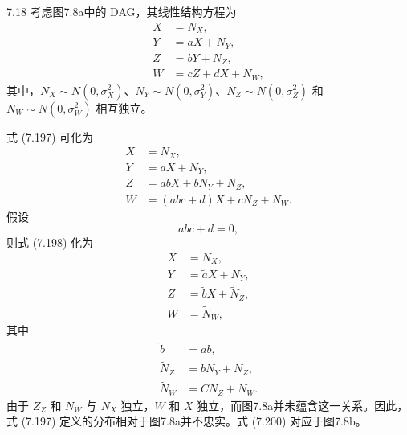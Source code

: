 \begin{bookexample}{7.18}
考虑图7.8a中的 DAG，其线性结构方程为
\begin{equation}
\begin{aligned}
X&=N_X,\\
Y&=aX+N_Y,\\
Z&=bY+N_Z,\\
W&=cZ+dX+N_W,
\end{aligned}
\tag{7.197}
\end{equation}
其中，$N_X\sim N(0,\sigma_X^2)$、$N_Y\sim N(0,\sigma_Y^2)$、$N_Z\sim N(0,\sigma_Z^2)$ 和 $N_W\sim N(0,\sigma_W^2)$ 相互独立。

式 (7.197) 可化为
\begin{equation}
\begin{aligned}
X&=N_X,\\
Y&=aX+N_Y,\\
Z&=abX+bN_Y+N_Z,\\
W&=(abc+d)X+cN_Z+N_W.
\end{aligned}
\tag{7.198}
\end{equation}
假设
\begin{equation}
abc+d=0,
\tag{7.199}
\end{equation}
则式 (7.198) 化为
\begin{equation}
\begin{aligned}
X&=N_X,\\
Y&=\widetilde aX+N_Y,\\
Z&=\widetilde bX+\widetilde N_Z,\\
W&=\widetilde N_W,
\end{aligned}
\tag{7.200}
\end{equation}
其中
\[
\begin{aligned}
\widetilde b&=ab,\\
\widetilde N_Z&=bN_Y+N_Z,\\
\widetilde N_W&=CN_Z+N_W.
\end{aligned}
\]
由于 $Z_Z$ 和 $N_W$ 与 $N_X$ 独立，$W$ 和 $X$ 独立，而图7.8a并未蕴含这一关系。因此，式 (7.197) 定义的分布相对于图7.8a并不忠实。式 (7.200) 对应于图7.8b。
\end{bookexample}

